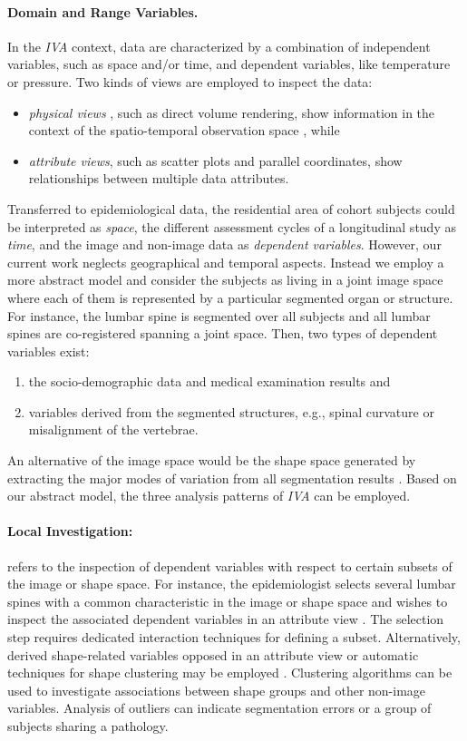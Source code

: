 \documentclass[journal]{style/vgtc} 			          %
\begin{document}
\paragraph{Domain and Range Variables. }
In the \emph{IVA} context, data are characterized by a combination of independent variables, such as space and/or time, and dependent variables, like temperature or pressure.
%
Two kinds of views are employed to inspect the data:
\begin{itemize} 
	\item \emph{physical views} \cite{Oeltze2013}, such as direct volume rendering, show information in the context of the spatio-temporal observation space \cite{Oeltze2007}, while
	\item \emph{attribute views}, such as scatter plots and parallel coordinates, show relationships between multiple data attributes.
\end{itemize}
Transferred to epidemiological data, the residential area of cohort subjects could be interpreted as \emph{space}, the different assessment cycles of a longitudinal study as \emph{time}, and the image and non-image data as \emph{dependent variables}.
%
However, our current work neglects geographical and temporal aspects.
%
Instead we employ a more abstract model and consider the subjects as living in a joint image space where each of them is represented by a particular segmented organ or structure.
%
For instance, the lumbar spine is segmented over all subjects and all lumbar spines are co-registered spanning a joint space.
%
Then, two types of dependent variables exist: 
\begin{enumerate}
	\item the socio-demographic data and medical examination results and 
	\item variables derived from the segmented structures, e.g., spinal curvature or misalignment of the vertebrae.
\end{enumerate}
An alternative of the image space would be the shape space generated by extracting the major modes of variation from all segmentation results \cite{Busking2010a}.
%
Based on our abstract model, the three analysis patterns of \emph{IVA} can be employed.

\paragraph{Local Investigation:} refers to the inspection of dependent variables with respect to certain subsets of the image or shape space.
%
For instance, the epidemiologist selects several lumbar spines with a common characteristic in the image or shape space and wishes to inspect the associated dependent variables in an attribute view \cite{Hermann2014}.
%
The selection step requires dedicated interaction techniques for defining a subset.
%
Alternatively, derived shape-related variables opposed in an attribute view or automatic techniques for shape clustering may be employed \cite{Klemm2013VMV}.
%
Clustering algorithms can be used to investigate associations between shape groups and other non-image variables.
%
Analysis of outliers can indicate segmentation errors or a group of subjects sharing a pathology.
\end{document}
